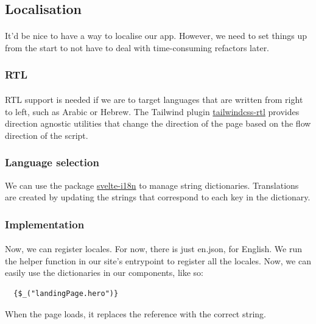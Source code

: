 \documentclass{report}
\begin{document}
\subsection{Localisation}
\paragraph{}
It'd be nice to have a way to localise our app. However, we need to set things up from the start to not have to deal with time-consuming refactors later.

\subsubsection{RTL}
\paragraph{}
RTL support is needed if we are to target languages that are written from right to left, such as Arabic or Hebrew. The Tailwind plugin \href{https://github.com/20lives/tailwindcss-rtl}{tailwindcss-rtl} provides direction agnostic utilities that change the direction of the page based on the flow direction of the script.

\subsubsection{Language selection}
We can use the package \href{https://github.com/kaisermann/svelte-i18n}{svelte-i18n} to manage string dictionaries. Translations are created by updating the strings that correspond to each key in the dictionary.

\subsubsection{Implementation}
\paragraph{}
Now, we can register locales. For now, there is just en.json, for English. We run the helper function in our site's entrypoint to register all the locales. Now, we can easily use the dictionaries in our components, like so:

\begin{verbatim}
  {$_("landingPage.hero")}
\end{verbatim}
When the page loads, it replaces the reference with the correct string.
\end{document}
